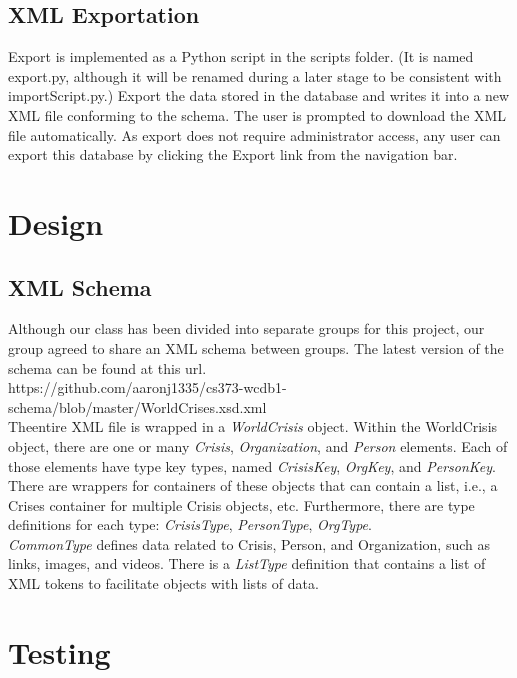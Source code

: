 \documentclass[12pt]{report}
\begin{document}
\subsection*{XML Exportation}
\hfill


Export is implemented as a Python script in the scripts folder.
(It is named export.py, although it will be renamed during a later stage to be consistent with importScript.py.)
Export the data stored in the database and writes it into a new XML file conforming to the schema.
The user is prompted to download the XML file automatically. 
As export does not require administrator access, any user can export this database by clicking the Export link from the navigation bar.


\newpage
\section*{Design}
\subsection*{XML Schema}
\hfill


Although our class has been divided into separate groups for this project, our group agreed to share an XML schema between groups.
The latest version of the schema can be found at this url.\\

\noindent \small
https://github.com/aaronj1335/cs373-wcdb1-schema/blob/master/WorldCrises.xsd.xml\\


Theentire XML file is wrapped in a \emph{WorldCrisis} object.
Within the WorldCrisis object, there are one or many \emph{Crisis}, \emph{Organization}, and \emph{Person} elements.
Each of those elements have type key types, named \emph{CrisisKey}, \emph{OrgKey}, and \emph{PersonKey}.
There are wrappers for containers of these objects that can contain a list,
i.e., a Crises container for multiple Crisis objects, etc.
Furthermore, there are type definitions for each type: \emph{CrisisType}, \emph{PersonType}, \emph{OrgType}.\\


\emph{CommonType} defines data related to Crisis, Person, and Organization,
such as links, images, and videos.
There is a \emph{ListType} definition that contains a list of XML tokens to facilitate objects with lists of data.

\newpage
\section*{Testing}
\hfill
\end{document}
